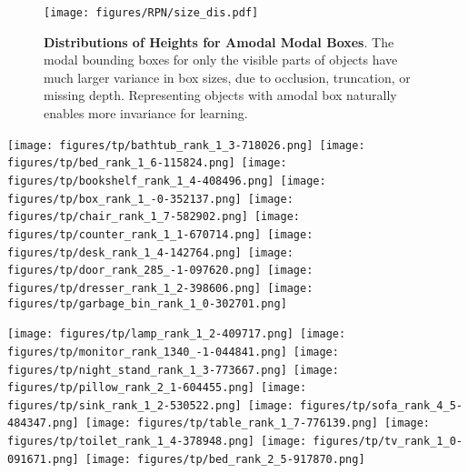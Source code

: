 \documentclass[10pt,twocolumn,letterpaper]{article}
\begin{document}
\begin{figure}[t]

\texttt{[image: figures/RPN/size\_dis.pdf]}

\caption{{\bf Distributions of Heights for Amodal \vs Modal Boxes}.
The modal bounding boxes for only the visible parts of objects have much larger variance in box sizes, due to occlusion, truncation, or missing depth. 
Representing objects with amodal box naturally enables more invariance for learning.}
\label{fig:amodalHist}
\vspace{-3mm}
\end{figure}



\def \mW {0.095}
\begin{figure*}[t]

\vspace{-3mm}

\texttt{[image: figures/tp/bathtub\_rank\_1\_3-718026.png]}~\texttt{[image: figures/tp/bed\_rank\_1\_6-115824.png]}~\texttt{[image: figures/tp/bookshelf\_rank\_1\_4-408496.png]}~\texttt{[image: figures/tp/box\_rank\_1\_-0-352137.png]}~\texttt{[image: figures/tp/chair\_rank\_1\_7-582902.png]}~\texttt{[image: figures/tp/counter\_rank\_1\_1-670714.png]}~\texttt{[image: figures/tp/desk\_rank\_1\_4-142764.png]}~\texttt{[image: figures/tp/door\_rank\_285\_-1-097620.png]}~\texttt{[image: figures/tp/dresser\_rank\_1\_2-398606.png]}~\texttt{[image: figures/tp/garbage\_bin\_rank\_1\_0-302701.png]}

\texttt{[image: figures/tp/lamp\_rank\_1\_2-409717.png]}~\texttt{[image: figures/tp/monitor\_rank\_1340\_-1-044841.png]}~\texttt{[image: figures/tp/night\_stand\_rank\_1\_3-773667.png]}~\texttt{[image: figures/tp/pillow\_rank\_2\_1-604455.png]}~\texttt{[image: figures/tp/sink\_rank\_1\_2-530522.png]}~\texttt{[image: figures/tp/sofa\_rank\_4\_5-484347.png]}~\texttt{[image: figures/tp/table\_rank\_1\_7-776139.png]}~\texttt{[image: figures/tp/toilet\_rank\_1\_4-378948.png]}~\texttt{[image: figures/tp/tv\_rank\_1\_0-091671.png]}~\texttt{[image: figures/tp/bed\_rank\_2\_5-917870.png]}


\vspace{-1mm}


\end{figure*}
\end{document}
